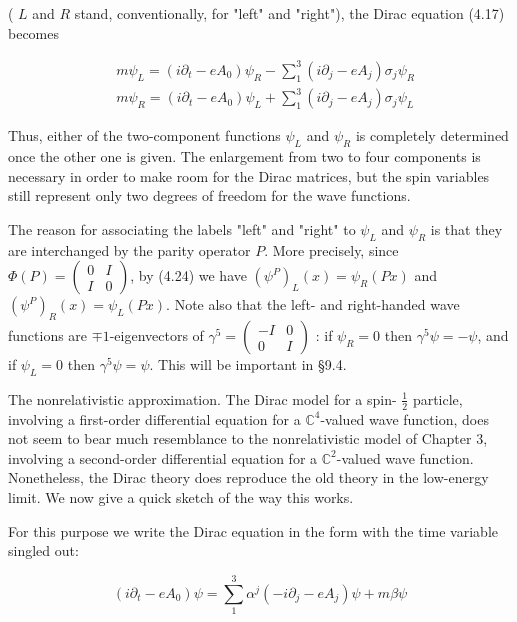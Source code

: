 \documentclass[10pt, letterpaper]{article}
\begin{document}
( $L$ and $R$ stand, conventionally, for "left" and "right"), the Dirac equation (4.17) becomes

$$
\begin{aligned}
& m \psi_{L}=\left(i \partial_{t}-e A_{0}\right) \psi_{R}-\sum_{1}^{3}\left(i \partial_{j}-e A_{j}\right) \sigma_{j} \psi_{R} \\
& m \psi_{R}=\left(i \partial_{t}-e A_{0}\right) \psi_{L}+\sum_{1}^{3}\left(i \partial_{j}-e A_{j}\right) \sigma_{j} \psi_{L}
\end{aligned}
$$

Thus, either of the two-component functions $\psi_{L}$ and $\psi_{R}$ is completely determined once the other one is given. The enlargement from two to four components is necessary in order to make room for the Dirac matrices, but the spin variables still represent only two degrees of freedom for the wave functions.

The reason for associating the labels "left" and "right" to $\psi_{L}$ and $\psi_{R}$ is that they are interchanged by the parity operator $P$. More precisely, since $\Phi(P)=\left(\begin{array}{cc}0 & I \\ I & 0\end{array}\right)$, by (4.24) we have $\left(\psi^{P}\right)_{L}(x)=\psi_{R}(P x)$ and $\left(\psi^{P}\right)_{R}(x)=\psi_{L}(P x)$. Note also that the left- and right-handed wave functions are $\mp 1$-eigenvectors of $\gamma^{5}=\left(\begin{array}{cl}-I & 0 \\ 0 & I\end{array}\right)$ : if $\psi_{R}=0$ then $\gamma^{5} \psi=-\psi$, and if $\psi_{L}=0$ then $\gamma^{5} \psi=\psi$. This will be important in §9.4.

The nonrelativistic approximation. The Dirac model for a spin- $\frac{1}{2}$ particle, involving a first-order differential equation for a $\mathbb{C}^{4}$-valued wave function, does not seem to bear much resemblance to the nonrelativistic model of Chapter 3, involving a second-order differential equation for a $\mathbb{C}^{2}$-valued wave function. Nonetheless, the Dirac theory does reproduce the old theory in the low-energy limit. We now give a quick sketch of the way this works.

For this purpose we write the Dirac equation in the form with the time variable singled out:

$$
\left(i \partial_{t}-e A_{0}\right) \psi=\sum_{1}^{3} \alpha^{j}\left(-i \partial_{j}-e A_{j}\right) \psi+m \beta \psi
$$
\end{document}
